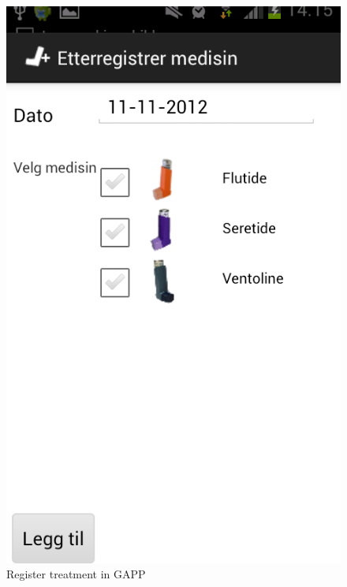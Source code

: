 \begin{figure}
\begin{minipage}[b]{0.4\linewidth}
		\includegraphics[width=0.20\paperwidth]{Pictures/Screenshots/register_treatment.png}
	\caption{Register treatment in GAPP}
	\label{fig:gapp-register-treatment}
	\end{minipage}
\end{figure}

